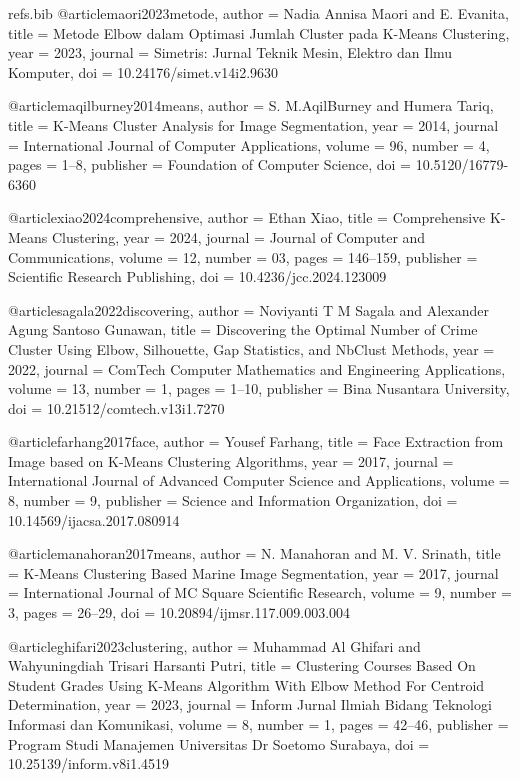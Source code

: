 \begin{filecontents*}[overwrite]{refs.bib}
@article{maori2023metode,
  author = {Nadia Annisa Maori and E. Evanita},
  title = {{Metode Elbow dalam Optimasi Jumlah Cluster pada K-Means Clustering}},
  year = {2023},
  journal = {Simetris: Jurnal Teknik Mesin, Elektro dan Ilmu Komputer},
  doi = {10.24176/simet.v14i2.9630}
}

@article{maqilburney2014means,
  author = {S. M.AqilBurney and Humera Tariq},
  title = {{K-Means Cluster Analysis for Image Segmentation}},
  year = {2014},
  journal = {International Journal of Computer Applications},
  volume = {96},
  number = {4},
  pages = {1--8},
  publisher = {Foundation of Computer Science},
  doi = {10.5120/16779-6360}
}

@article{xiao2024comprehensive,
  author = {Ethan Xiao},
  title = {{Comprehensive K-Means Clustering}},
  year = {2024},
  journal = {Journal of Computer and Communications},
  volume = {12},
  number = {03},
  pages = {146--159},
  publisher = {Scientific Research Publishing},
  doi = {10.4236/jcc.2024.123009}
}

@article{sagala2022discovering,
  author = {Noviyanti T M Sagala and Alexander Agung Santoso Gunawan},
  title = {{Discovering the Optimal Number of Crime Cluster Using Elbow, Silhouette, Gap Statistics, and NbClust Methods}},
  year = {2022},
  journal = {ComTech Computer Mathematics and Engineering Applications},
  volume = {13},
  number = {1},
  pages = {1--10},
  publisher = {Bina Nusantara University},
  doi = {10.21512/comtech.v13i1.7270}
}

@article{farhang2017face,
  author = {Yousef Farhang},
  title = {{Face Extraction from Image based on K-Means Clustering Algorithms}},
  year = {2017},
  journal = {International Journal of Advanced Computer Science and Applications},
  volume = {8},
  number = {9},
  publisher = {Science and Information Organization},
  doi = {10.14569/ijacsa.2017.080914}
}

@article{manahoran2017means,
  author = {N. Manahoran and M. V. Srinath},
  title = {{K-Means Clustering Based Marine Image Segmentation}},
  year = {2017},
  journal = {International Journal of MC Square Scientific Research},
  volume = {9},
  number = {3},
  pages = {26--29},
  doi = {10.20894/ijmsr.117.009.003.004}
}

@article{ghifari2023clustering,
  author = {Muhammad Al Ghifari and Wahyuningdiah Trisari Harsanti Putri},
  title = {{Clustering Courses Based On Student Grades Using K-Means Algorithm With Elbow Method For Centroid Determination}},
  year = {2023},
  journal = {Inform Jurnal Ilmiah Bidang Teknologi Informasi dan Komunikasi},
  volume = {8},
  number = {1},
  pages = {42--46},
  publisher = {Program Studi Manajemen Universitas Dr Soetomo Surabaya},
  doi = {10.25139/inform.v8i1.4519}
}


\end{filecontents*}
